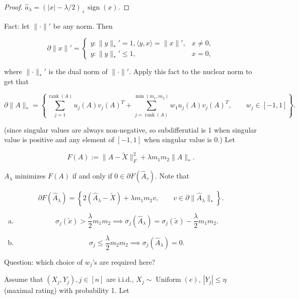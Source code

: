\begin{example}
\begin{proof}
\( \hat{a}_\lambda = (|x| - \lambda/2)_+ \operatorname{sign}(x)\). 

\end{proof}

Fact: let \(\lVert \cdot \rVert '\) be any norm. Then 

\[
\partial \lVert x \rVert' = \begin{cases}
y: \lVert y \rVert_*' = 1, \langle y, x \rangle = \lVert x \rVert', & x \neq 0, \\
y: \lVert y \rVert_*' \leq 1, & x = 0,
\end{cases}
\]

where \(\lVert \cdot \rVert_*'\) is the dual norm of \(\lVert \cdot \rVert'\). Apply this fact to the nuclear norm to get that 

\[
\partial \lVert A \rVert_* = \left\{  \sum_{j=1}^{\operatorname{rank}(A)} u_j(A) v_j(A)^T + \sum_{j= \operatorname{rank}(A)}^{\min(m_1, m_2)} w_1 u_j(A) v_j(A)^T , \qquad w_j \in [-1, 1] \right\}.
\]

(since singular values are always non-negative, so subdifferntial is 1 when singular value is positive and any element of \([-1,1]\) when singular value is 0.) Let

\[
F(A) := \lVert A - \tilde{X} \rVert_F^2 + \lambda m_1 m_2 \lVert A \rVert_*.
\]

\(A_\lambda\) minimizes \(F(A)\) if and only if \(0 \in \partial F(\hat{A}_\tau)\). Note that 

\[
\partial F(\hat{A}_\lambda) = \left\{ 2(\hat{A}_\lambda - \tilde{X}) + \lambda m_1 m_2 v, \qquad v \in \partial \lVert \hat{A}_\lambda \rVert_* \right\}.
\]

\begin{enumerate}[(a)]

\item

\[
\sigma_j(\tilde{x}) > \frac{\lambda}{2} m_1 m_2 \implies \sigma_j(\hat{A}_\lambda) = \sigma_j(\tilde{x}) - \frac{\lambda}{2} m_1 m_2.
\]

\item

\[
\sigma_j \leq \frac{\lambda}{2} m_2 m_2 \implies \sigma_j(\hat{A}_\lambda) = 0.
\]

\end{enumerate}

Question: which choice of \(w_j\)'s are required here?

\begin{theorem}

Assume that \((X_j, Y_j), j\in [n]\) are i.i.d., \(X_j \sim \operatorname{Uniform}(e)\), \(|Y_j| \leq \eta\) (maximal rating) with probability 1. Let 


\end{theorem}
\end{example}

